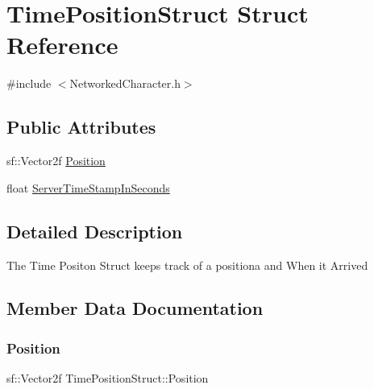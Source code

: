 \hypertarget{struct_time_position_struct}{}\section{Time\+Position\+Struct Struct Reference}
\label{struct_time_position_struct}


{\ttfamily \#include $<$Networked\+Character.\+h$>$}

\subsection*{Public Attributes}
\begin{DoxyCompactItemize}
\item 
sf\+::\+Vector2f \hyperlink{struct_time_position_struct_a18fff487f9230e49bbf30963aa3b3bc9}{Position}
\item 
float \hyperlink{struct_time_position_struct_a6f8326b69dec7f6421870058ce9ef230}{Server\+Time\+Stamp\+In\+Seconds}
\end{DoxyCompactItemize}


\subsection{Detailed Description}
The Time Positon Struct keeps track of a positiona and When it Arrived 

\subsection{Member Data Documentation}
\hypertarget{struct_time_position_struct_a18fff487f9230e49bbf30963aa3b3bc9}{}\label{struct_time_position_struct_a18fff487f9230e49bbf30963aa3b3bc9} 
\subsubsection{\texorpdfstring{Position}{Position}}
{\footnotesize\ttfamily sf\+::\+Vector2f Time\+Position\+Struct\+::\+Position}

\hypertarget{struct_time_position_struct_a6f8326b69dec7f6421870058ce9ef230}{}\label{struct_time_position_struct_a6f8326b69dec7f6421870058ce9ef230} 
